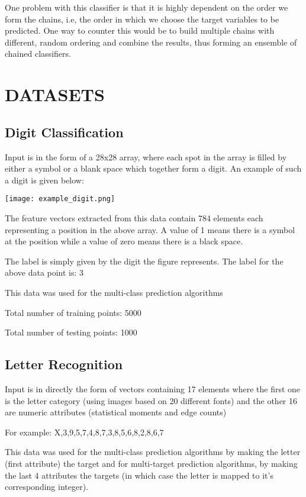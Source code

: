 \documentclass[letterpaper, 11 pt, conference]{IEEEtran}  %
\begin{document}
One problem with this classifier is that it is highly dependent on the order we form the chains, i.e, the order in which we choose the target variables to be predicted. One way to counter this would be to build multiple chains with different, random ordering and combine the results, thus forming an ensemble of chained classifiers.

\section{DATASETS}

\subsection{Digit Classification}

Input is in the form of a 28x28 array, where each spot in the array is filled by either a symbol or a blank space which together form a digit. An example of such a digit is given below:

\begin{center}
	\texttt{[image: example\_digit.png]}
\end{center}

The feature vectors extracted from this data contain 784 elements each representing a position in the above array. A value of 1 means there is a symbol at the position while a value of zero means there is a black space.

The label is simply given by the digit the figure represents. The label for the above data point is: 3

This data was used for the multi-class prediction algorithms

Total number of training points: 5000

Total number of testing points: 1000

\subsection{Letter Recognition}

Input is in directly the form of vectors containing 17 elements where the first one is the letter category (using images based on 20 different fonts) and the other 16 are numeric attributes (statistical moments and edge counts)

For example: X,3,9,5,7,4,8,7,3,8,5,6,8,2,8,6,7

This data was used for the multi-class prediction algorithms by making the letter (first attribute) the target and for multi-target prediction algorithms, by making the last 4 attributes the targets (in which case the letter is mapped to it's corresponding integer).
\end{document}
